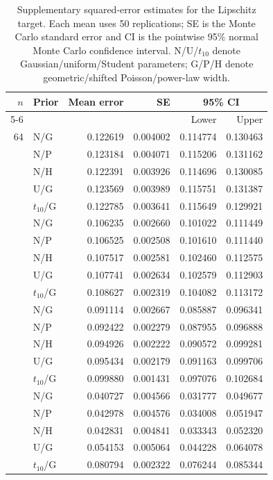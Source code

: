 \begin{table}[H]
\caption{Supplementary squared-error estimates for the Lipschitz target. Each mean uses 50 replications; SE is the Monte Carlo standard error and CI is the pointwise 95\% normal Monte Carlo confidence interval. N/U/$t_{10}$ denote Gaussian/uniform/Student parameters; G/P/H denote geometric/shifted Poisson/power-law width.}
\label{tab:supp-lipschitz}
\centering\small
\begin{tabular}{@{}rlrrrr@{}}
\toprule
$n$ & Prior & Mean error & SE & \multicolumn{2}{c}{95\% CI}\\
\cmidrule(l){5-6}
 & & & & Lower & Upper\\
\midrule
64 & N/G & 0.122619 & 0.004002 & 0.114774 & 0.130463\\
 & N/P & 0.123184 & 0.004071 & 0.115206 & 0.131162\\
 & N/H & 0.122391 & 0.003926 & 0.114696 & 0.130085\\
 & U/G & 0.123569 & 0.003989 & 0.115751 & 0.131387\\
 & $t_{10}$/G & 0.122785 & 0.003641 & 0.115649 & 0.129921\\
\addlinespace[3pt]
128 & N/G & 0.106235 & 0.002660 & 0.101022 & 0.111449\\
 & N/P & 0.106525 & 0.002508 & 0.101610 & 0.111440\\
 & N/H & 0.107517 & 0.002581 & 0.102460 & 0.112575\\
 & U/G & 0.107741 & 0.002634 & 0.102579 & 0.112903\\
 & $t_{10}$/G & 0.108627 & 0.002319 & 0.104082 & 0.113172\\
\addlinespace[3pt]
256 & N/G & 0.091114 & 0.002667 & 0.085887 & 0.096341\\
 & N/P & 0.092422 & 0.002279 & 0.087955 & 0.096888\\
 & N/H & 0.094926 & 0.002222 & 0.090572 & 0.099281\\
 & U/G & 0.095434 & 0.002179 & 0.091163 & 0.099706\\
 & $t_{10}$/G & 0.099880 & 0.001431 & 0.097076 & 0.102684\\
\addlinespace[3pt]
512 & N/G & 0.040727 & 0.004566 & 0.031777 & 0.049677\\
 & N/P & 0.042978 & 0.004576 & 0.034008 & 0.051947\\
 & N/H & 0.042831 & 0.004841 & 0.033343 & 0.052320\\
 & U/G & 0.054153 & 0.005064 & 0.044228 & 0.064078\\
 & $t_{10}$/G & 0.080794 & 0.002322 & 0.076244 & 0.085344\\

\end{tabular}
\end{table}
